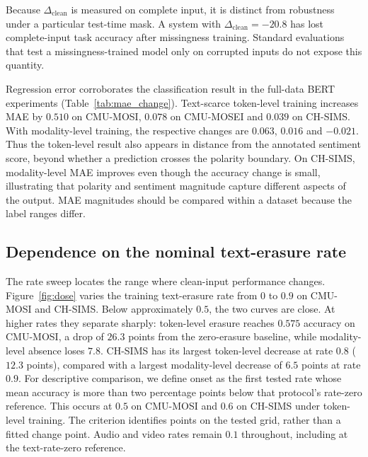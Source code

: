 \documentclass[preprint,11pt]{elsarticle}
\newcommand{\tokenlevel}{token-level}
\newcommand{\modlevel}{modality-level}
\newcommand{\degr}{\ensuremath{\Delta_{\mathrm{clean}}}}  %
\begin{document}
Because $\degr$ is measured on complete input, it is distinct from robustness
under a particular test-time mask. A system with $\degr=-20.8$ has lost
complete-input task accuracy after missingness training. Standard evaluations
that test a missingness-trained model only on corrupted inputs do not expose
this quantity.

Regression error corroborates the classification result in the full-data BERT
experiments (Table~\ref{tab:mae_change}). Text-scarce token-level training
increases MAE by $0.510$ on CMU-MOSI, $0.078$ on CMU-MOSEI and $0.039$ on
CH-SIMS. With modality-level training, the respective changes are $0.063$,
$0.016$ and $-0.021$. Thus the token-level result also appears in distance from the
annotated sentiment score, beyond whether a prediction crosses the polarity
boundary. On CH-SIMS, modality-level MAE improves even though the accuracy
change is small, illustrating that polarity and sentiment magnitude capture
different aspects of the output. MAE magnitudes should be compared within a
dataset because the label ranges differ.

\begin{table}[t]
\centering
\caption{Clean-input MAE under benign and text-scarce training with BERT on
the full datasets. A positive change indicates higher error. Changes are
mean $\pm$ population standard deviation across five matched seeds; the two
regime columns show mean MAE. All values use the original sentiment scale.}
\label{tab:mae_change}
\small

\end{table}

\subsection{Dependence on the nominal text-erasure rate}

The rate sweep locates the range where clean-input performance changes.
Figure~\ref{fig:dose} varies the
training text-erasure rate from $0$ to $0.9$ on CMU-MOSI and CH-SIMS. Below
approximately $0.5$, the two curves are close. At higher rates they separate
sharply: \tokenlevel{} erasure
reaches $0.575$ accuracy on CMU-MOSI, a drop of $26.3$ points
from the zero-erasure baseline, while \modlevel{} absence loses $7.8$. CH-SIMS
has its largest token-level decrease at rate $0.8$ ($12.3$ points), compared
with a largest modality-level decrease of $6.5$ points at rate $0.9$.
For descriptive comparison, we define onset as the first tested rate whose
mean accuracy is more than two percentage points below that protocol's
rate-zero reference. This occurs at $0.5$ on CMU-MOSI and $0.6$ on CH-SIMS
under token-level training. The criterion identifies points on the tested
grid, rather than a fitted change point. Audio and video rates remain $0.1$
throughout, including at the text-rate-zero reference.
\end{document}
